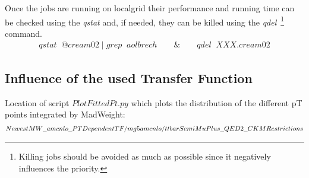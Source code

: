 
Once the jobs are running on localgrid their performance and running time can be checked using the \textit{qstat} and, if needed, they can be killed using the \textit{qdel}~\footnote{Killing jobs should be avoided as much as possible since it negatively influences the priority.} command.
\begin{eqnarray}
 qstat \; \; @cream02 \; | \; grep \; \; aolbrech \qquad \& \qquad qdel \; \; XXX.cream02 \nonumber
\end{eqnarray}

\subsection{Influence of the used Transfer Function}
Location of script $PlotFittedPt.py$ which plots the distribution of the different pT points integrated by MadWeight:
\begin{eqnarray}
 \scriptsize NewestMW\_amcnlo\_PTDependentTF/mg5amcnlo/ttbarSemiMuPlus\_QED2\_CKMRestrictions \nonumber
\end{eqnarray}


